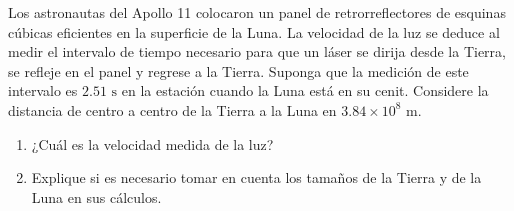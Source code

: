 \item Los astronautas del Apollo 11 colocaron un panel de retrorreflectores de esquinas cúbicas eficientes en la superficie de la Luna. La velocidad de la luz se deduce al medir el intervalo de tiempo necesario para que un láser se dirija desde la Tierra, se refleje en el panel y regrese a la Tierra. Suponga que la medición de este intervalo es $2.51\text{ s}$ en la estación cuando la Luna está en su cenit. Considere la distancia de centro a centro de la Tierra a la Luna en $3.84 \times 10^8\text{ m}$.
\begin{enumerate}
    \item ¿Cuál es la velocidad medida de la luz?
    \item Explique si es necesario tomar en cuenta los tamaños de la Tierra y de la Luna en sus cálculos.
\end{enumerate}